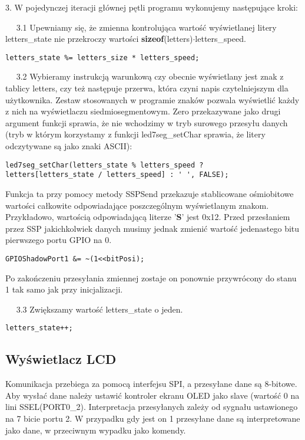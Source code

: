\documentclass[a4paper,12pt,twoside]{article}
\theoremstyle{plain}
\theoremstyle{definition}
\theoremstyle{remark}
\begin{document}
3. W pojedynczej iteracji głównej pętli programu wykonujemy następujące kroki:

$\quad$ 3.1 Upewniamy się, że zmienna kontrolująca wartość wyświetlanej litery letters\_state nie przekroczy wartości \textbf{sizeof}(letters)$\cdot$letters\_speed.
\begin{verbatim}
letters_state %= letters_size * letters_speed;
\end{verbatim}

$\quad$ 3.2 Wybieramy instrukcją warunkową czy obecnie wyświetlany jest znak z tablicy letters, czy też następuje przerwa, która czyni napis czytelniejszym dla użytkownika. Zestaw stosowanych w programie znaków pozwala wyświetlić każdy z nich na wyświetlaczu siedmiosegmentowym. Zero przekazywane jako drugi argument funkcji sprawia, że nie wchodzimy w tryb surowego przesyłu danych (tryb w którym korzystamy z funkcji led7seg\_setChar sprawia, że litery odczytywane są jako znaki ASCII):
\begin{verbatim}
led7seg_setChar(letters_state % letters_speed ?
letters[letters_state / letters_speed] : ' ', FALSE);
\end{verbatim}
Funkcja ta przy pomocy metody SSPSend przekazuje stablicowane ośmiobitowe wartości całkowite odpowiadające poszczególnym wyświetlanym znakom. Przykładowo, wartością odpowiadającą literze '\textbf{S}' jest 0x12. Przed przesłaniem przez SSP jakichkolwiek danych musimy jednak zmienić wartość jedenastego bitu pierwszego portu GPIO na 0. 
\begin{verbatim}
GPIOShadowPort1 &= ~(1<<bitPosi);
\end{verbatim}
Po zakończeniu przesyłania zmiennej zostaje on ponownie przywrócony do stanu 1 tak samo jak przy inicjalizacji.

$\quad$ 3.3 Zwiększamy wartość letters\_state o jeden.
\begin{verbatim}
letters_state++;
\end{verbatim}
\subsection{Wyświetlacz LCD}

Komunikacja przebiega za pomocą interfejsu SPI, a przesyłane dane są 8-bitowe. 
Aby wysłać dane należy ustawić kontroler ekranu OLED jako slave (wartość 0 na lini SSEL(PORT0\_2).
Interpretacja przesyłanych zależy od sygnału ustawionego na 7 bicie portu 2. W przypadku gdy
jest on 1 przesyłane dane są interpretowane jako dane, w przeciwnym wypadku jako komendy. 
\end{document}
